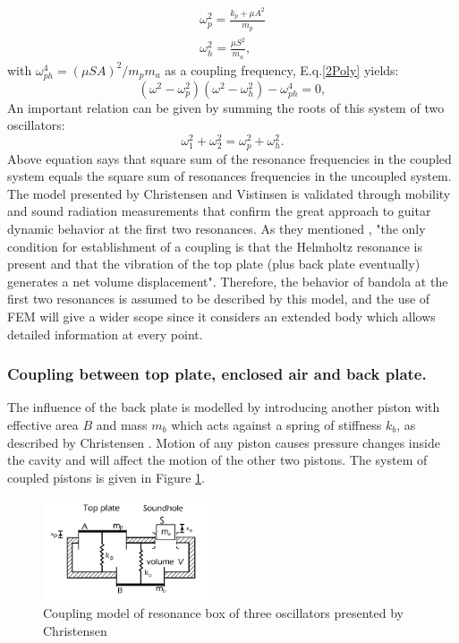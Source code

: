 \begin{eqnarray*}
\omega^2_p = \frac{k_p + \mu A^2}{m_p}\\
\omega^2_h = \frac{\mu S^2}{m_a},
\end{eqnarray*}
with $\omega^4_{ph}=(\mu SA)^2/m_p m_a$ as a coupling frequency, E.q.\ref{2Poly} yields:
\begin{equation}
(\omega^2 - \omega^2_p)(\omega^2 - \omega^2_h)- \omega^4_{ph} =0,
\end{equation}
An important relation can be given by summing the roots of this system of two oscillators:
\begin{equation}
\omega_{1}^2 + \omega_{2}^2 = \omega^2_p + \omega^2_h.
\label{Combination2}
\end{equation}
Above equation says that square sum of the resonance frequencies in the coupled system equals the square sum of resonances frequencies in the uncoupled system.\\

The model presented by Christensen and Vistinsen is validated through mobility and sound radiation measurements that confirm the great approach to guitar dynamic behavior at the first two resonances. As they mentioned \cite{Christensen}, "the only condition for establishment of a coupling is that the Helmholtz resonance is present and that the vibration of the top plate (plus back plate eventually) generates a net volume displacement". Therefore, the behavior of bandola at the first two resonances is assumed to be described by this model, and the use of FEM will give a wider scope since it considers an extended body which allows detailed information at every point.

\subsubsection{Coupling between top plate, enclosed air and back plate.}

The influence of the back plate is modelled by introducing another piston with effective area $B$ and mass $m_b$ which acts against a spring of stiffness $k_b$, as described by Christensen \cite{Christensen3}. Motion of any piston causes pressure changes inside the cavity and will affect the motion of the other two pistons. The system of coupled pistons is given in Figure \ref{Top-Back-Air}.

\begin{figure}[h]
\centering
\includegraphics[height=3cm]{img/Top-Back-Air.png}
\caption{Coupling model of resonance box of three oscillators presented by Christensen}
\label{Top-Back-Air}
\end{figure}

